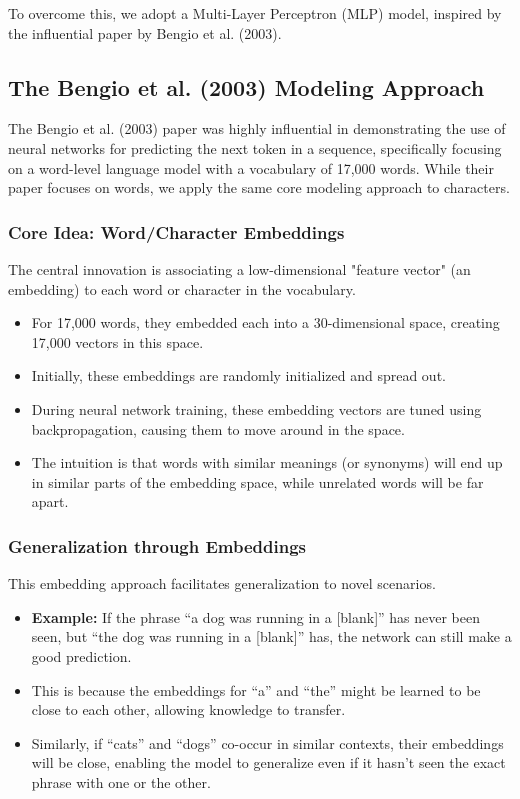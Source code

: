 To overcome this, we adopt a Multi-Layer Perceptron (MLP) model, inspired by the influential paper by Bengio et al. (2003).

\subsection{The Bengio et al. (2003) Modeling Approach}

The Bengio et al. (2003) paper was highly influential in demonstrating the use of neural networks for predicting the next token in a sequence, specifically focusing on a word-level language model with a vocabulary of 17,000 words. While their paper focuses on words, we apply the same core modeling approach to characters.

\subsubsection{Core Idea: Word/Character Embeddings}
The central innovation is associating a low-dimensional "feature vector" (an embedding) to each word or character in the vocabulary.
\begin{itemize}
    \item For 17,000 words, they embedded each into a 30-dimensional space, creating 17,000 vectors in this space.
    \item Initially, these embeddings are randomly initialized and spread out.
    \item During neural network training, these embedding vectors are tuned using backpropagation, causing them to move around in the space.
    \item The intuition is that words with similar meanings (or synonyms) will end up in similar parts of the embedding space, while unrelated words will be far apart.
\end{itemize}

\subsubsection{Generalization through Embeddings}
This embedding approach facilitates generalization to novel scenarios.
\begin{itemize}
    \item \textbf{Example:} If the phrase ``a dog was running in a [blank]'' has never been seen, but ``the dog was running in a [blank]'' has, the network can still make a good prediction.
    \item This is because the embeddings for ``a'' and ``the'' might be learned to be close to each other, allowing knowledge to transfer.
    \item Similarly, if ``cats'' and ``dogs'' co-occur in similar contexts, their embeddings will be close, enabling the model to generalize even if it hasn't seen the exact phrase with one or the other.
\end{itemize}


